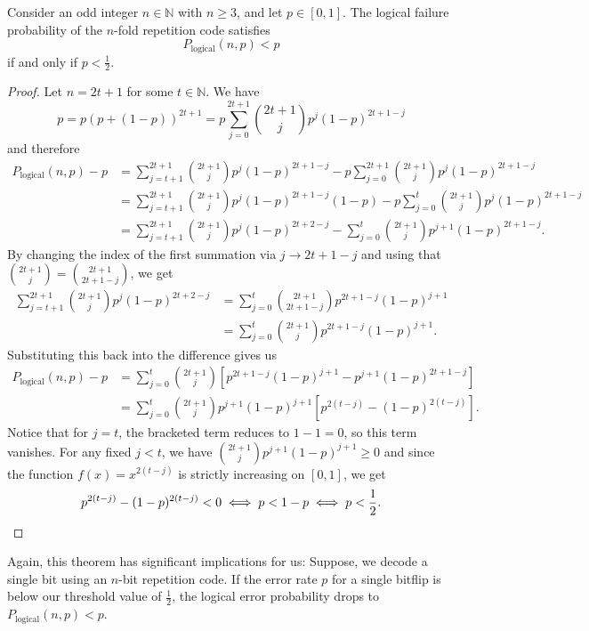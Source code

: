 \documentclass[a4paper, oneside, 12pt]{amsart}
\begin{document}
\begin{theorem}\label{thm:threshold-theorem}
  Consider an odd integer \(n \in \mathbb{N}\) with \(n \geq 3\), and let \(p \in [0, 1]\). The logical failure probability of the \(n\)-fold repetition code satisfies
  \begin{equation*}
    P_{\text{logical}}(n, p) < p
  \end{equation*}
  if and only if \(p < \frac{1}{2}\).
\end{theorem}
\begin{proof}
  Let \(n = 2t+1\) for some \(t \in \mathbb{N}\).
  We have
  \begin{equation*}
    p
    = p (p + (1-p))^{2t+1}
    = p\sum_{j=0}^{2t+1} \binom{2t+1}{j} p^{j} (1-p)^{2t+1-j}
  \end{equation*}
  and therefore
  \begin{align*}
    P_{\text{logical}}(n, p) - p
    &= \sum_{j=t+1}^{2t+1} \binom{2t+1}{j} p^j (1-p)^{2t+1-j}
      - p\sum_{j=0}^{2t+1} \binom{2t+1}{j} p^{j} (1-p)^{2t+1-j} \\
    &= \sum_{j=t+1}^{2t+1} \binom{2t+1}{j} p^j (1-p)^{2t+1-j}(1-p)
      - p \sum_{j=0}^{t} \binom{2t+1}{j} p^{j} (1-p)^{2t+1-j} \\
    &= \sum_{j=t+1}^{2t+1} \binom{2t+1}{j} p^j (1-p)^{2t+2-j} - \sum_{j=0}^{t} \binom{2t+1}{j} p^{j+1} (1-p)^{2t+1-j}.
  \end{align*}
By changing the index of the first summation via \(j \to 2t+1-j\) and using that  \(\binom{2t+1}{j} = \binom{2t+1}{2t+1-j}\), we get
  \begin{align*}
    \sum_{j=t+1}^{2t+1} \binom{2t+1}{j} p^j (1-p)^{2t+2-j} &= \sum_{j=0}^{t} \binom{2t+1}{2t+1-j} p^{2t+1-j} (1-p)^{j+1} \\
    &= \sum_{j=0}^{t} \binom{2t+1}{j} p^{2t+1-j} (1-p)^{j+1}.
  \end{align*}
  Substituting this back into the difference  gives us
  \begin{align*}
    P_{\text{logical}}(n, p) - p &= \sum_{j=0}^{t} \binom{2t+1}{j} \left[ p^{2t+1-j} (1-p)^{j+1} - p^{j+1} (1-p)^{2t+1-j} \right] \\
    &= \sum_{j=0}^{t} \binom{2t+1}{j} p^{j+1} (1-p)^{j+1} \left[ p^{2(t-j)} - (1-p)^{2(t-j)} \right].
  \end{align*}
  Notice that for \(j = t\), the bracketed term reduces to \(1 - 1 = 0\), so this  term vanishes. For any fixed \(j < t\), we have \(\binom{2t+1}{j} p^{j+1} (1-p)^{j+1}\geq 0\) and since the function \(f(x) = x^{2(t-j)}\) is strictly increasing on \([0,1]\), we get
  \begin{equation*}
    p^{2(t-j)} - (1-p)^{2(t-j)} < 0 \iff p < 1-p \iff p < \frac{1}{2}. \qedhere
  \end{equation*}
\end{proof}
Again, this theorem has significant implications for us: Suppose, we  decode a single bit using an \(n\)-bit repetition code.
If the error rate \(p\) for a single bitflip is below our  threshold value of \(\frac{1}{2}\), the logical error probability drops to \(P_{\text{logical}}(n,p) < p\).
\end{document}
